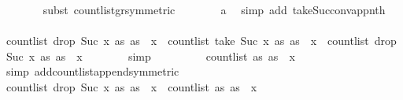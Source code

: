 \begin{isabellebody}
\ \ \ \ \ \ \isamarkupfalse%
\ {\isacharparenleft}{\kern0pt}subst\ count{\isacharunderscore}{\kern0pt}list{\isacharunderscore}{\kern0pt}gr{\isacharunderscore}{\kern0pt}{}{\isacharbrackleft}{\kern0pt}symmetric{\isacharbrackright}{\kern0pt}{\isacharparenright}{\kern0pt}\isanewline
\ \ \ \ \ \ \isamarkupfalse%
\ a\ \isamarkupfalse%
\ {\isacharparenleft}{\kern0pt}simp\ add{\isacharcolon}{\kern0pt}\ take{\isacharunderscore}{\kern0pt}Suc{\isacharunderscore}{\kern0pt}conv{\isacharunderscore}{\kern0pt}app{\isacharunderscore}{\kern0pt}nth{\isacharparenright}{\kern0pt}\isanewline
\ \ \ \ \isamarkupfalse%
\ {\isachardoublequoteopen}count{\isacharunderscore}{\kern0pt}list\ {\isacharparenleft}{\kern0pt}drop\ {\isacharparenleft}{\kern0pt}Suc\ x{\isacharparenright}{\kern0pt}\ as{\isacharparenright}{\kern0pt}\ {\isacharparenleft}{\kern0pt}as\ {\isacharbang}{\kern0pt}\ x{\isacharparenright}{\kern0pt}\ {\isacharless}{\kern0pt}\ count{\isacharunderscore}{\kern0pt}list\ {\isacharparenleft}{\kern0pt}take\ {\isacharparenleft}{\kern0pt}Suc\ x{\isacharparenright}{\kern0pt}\ as{\isacharparenright}{\kern0pt}\ {\isacharparenleft}{\kern0pt}as\ {\isacharbang}{\kern0pt}\ x{\isacharparenright}{\kern0pt}\ {\isacharplus}{\kern0pt}\ count{\isacharunderscore}{\kern0pt}list\ {\isacharparenleft}{\kern0pt}drop\ {\isacharparenleft}{\kern0pt}Suc\ x{\isacharparenright}{\kern0pt}\ as{\isacharparenright}{\kern0pt}\ {\isacharparenleft}{\kern0pt}as\ {\isacharbang}{\kern0pt}\ x{\isacharparenright}{\kern0pt}{\isachardoublequoteclose}\isanewline
\ \ \ \ \ \ \isamarkupfalse%
\ {\isacharparenleft}{\kern0pt}simp{\isacharparenright}{\kern0pt}\isanewline
\ \ \ \ \isamarkupfalse%
\ \isamarkupfalse%
\ {\isachardoublequoteopen}{\isachardot}{\kern0pt}{\isachardot}{\kern0pt}{\isachardot}{\kern0pt}\ {\isacharequal}{\kern0pt}\ count{\isacharunderscore}{\kern0pt}list\ as\ {\isacharparenleft}{\kern0pt}as\ {\isacharbang}{\kern0pt}\ x{\isacharparenright}{\kern0pt}{\isachardoublequoteclose}\isanewline
\ \ \ \ \ \ \isamarkupfalse%
\ {\isacharparenleft}{\kern0pt}simp\ add{\isacharcolon}{\kern0pt}count{\isacharunderscore}{\kern0pt}list{\isacharunderscore}{\kern0pt}append{\isacharbrackleft}{\kern0pt}symmetric{\isacharbrackright}{\kern0pt}{\isacharparenright}{\kern0pt}\isanewline
\ \ \ \ \isamarkupfalse%
\ \isamarkupfalse%
\ {\isachardoublequoteopen}count{\isacharunderscore}{\kern0pt}list\ {\isacharparenleft}{\kern0pt}drop\ {\isacharparenleft}{\kern0pt}Suc\ x{\isacharparenright}{\kern0pt}\ as{\isacharparenright}{\kern0pt}\ {\isacharparenleft}{\kern0pt}as\ {\isacharbang}{\kern0pt}\ x{\isacharparenright}{\kern0pt}\ {\isacharless}{\kern0pt}\ count{\isacharunderscore}{\kern0pt}list\ as\ {\isacharparenleft}{\kern0pt}as\ {\isacharbang}{\kern0pt}\ x{\isacharparenright}{\kern0pt}{\isachardoublequoteclose}\isanewline

\end{isabellebody}
